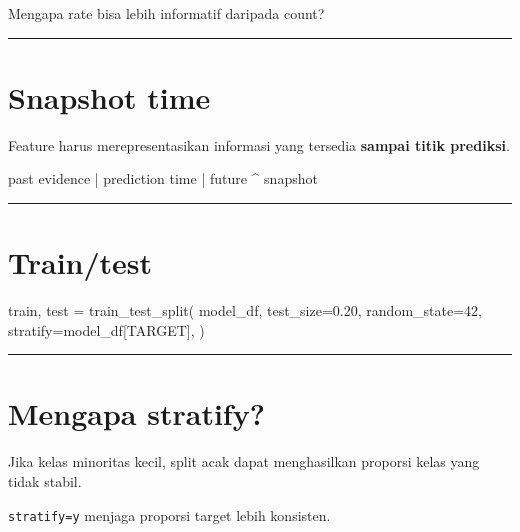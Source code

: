 \documentclass[
  indonesian,
  letterpaper,
  DIV=11,
  numbers=noendperiod]{scrreprt}
\newenvironment{Shaded}{\begin{snugshade}}{\end{snugshade}}
\newcommand{\DecValTok}[1]{\textcolor[rgb]{0.68,0.00,0.00}{#1}}
\newcommand{\FloatTok}[1]{\textcolor[rgb]{0.68,0.00,0.00}{#1}}
\newcommand{\NormalTok}[1]{\textcolor[rgb]{0.00,0.23,0.31}{#1}}
\newcommand{\OperatorTok}[1]{\textcolor[rgb]{0.37,0.37,0.37}{#1}}
\begin{document}
Mengapa rate bisa lebih informatif daripada count?

\begin{center}\rule{0.5\linewidth}{0.5pt}\end{center}

\section{Snapshot time}\label{snapshot-time}

Feature harus merepresentasikan informasi yang tersedia \textbf{sampai
titik prediksi}.

\begin{Shaded}
\begin{Highlighting}[]
\NormalTok{past evidence | prediction time | future}
\NormalTok{              \^{}}
\NormalTok{          snapshot}
\end{Highlighting}
\end{Shaded}

\begin{center}\rule{0.5\linewidth}{0.5pt}\end{center}

\section{Train/test}\label{traintest}

\begin{Shaded}
\begin{Highlighting}[]
\NormalTok{train, test }\OperatorTok{=}\NormalTok{ train\_test\_split(}
\NormalTok{    model\_df,}
\NormalTok{    test\_size}\OperatorTok{=}\FloatTok{0.20}\NormalTok{,}
\NormalTok{    random\_state}\OperatorTok{=}\DecValTok{42}\NormalTok{,}
\NormalTok{    stratify}\OperatorTok{=}\NormalTok{model\_df[TARGET],}
\NormalTok{)}
\end{Highlighting}
\end{Shaded}

\begin{center}\rule{0.5\linewidth}{0.5pt}\end{center}

\section{Mengapa stratify?}\label{mengapa-stratify}

Jika kelas minoritas kecil, split acak dapat menghasilkan proporsi kelas
yang tidak stabil.

\texttt{stratify=y} menjaga proporsi target lebih konsisten.
\end{document}
